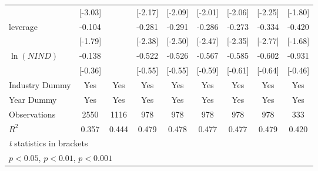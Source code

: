{\begin{tabular}{l*{8}{c}}
                    &     [-3.03]         &                     &     [-2.17]         &     [-2.09]         &     [-2.01]         &     [-2.06]         &     [-2.25]         &     [-1.80]         \\
[1em]
leverage            &      -0.104         &                     &      -0.281\sym{*}  &      -0.291\sym{*}  &      -0.286\sym{*}  &      -0.273\sym{*}  &      -0.334\sym{**} &      -0.420         \\
                    &     [-1.79]         &                     &     [-2.38]         &     [-2.50]         &     [-2.47]         &     [-2.35]         &     [-2.77]         &     [-1.68]         \\
[1em]
 $ \ln(NIND) $      &      -0.138         &                     &      -0.522         &      -0.526         &      -0.567         &      -0.585         &      -0.602         &      -0.931         \\
                    &     [-0.36]         &                     &     [-0.55]         &     [-0.55]         &     [-0.59]         &     [-0.61]         &     [-0.64]         &     [-0.46]         \\
\hline
Industry Dummy      &         Yes         &         Yes         &         Yes         &         Yes         &         Yes         &         Yes         &         Yes         &         Yes         \\
Year Dummy          &         Yes         &         Yes         &         Yes         &         Yes         &         Yes         &         Yes         &         Yes         &         Yes         \\
Observations        &        2550         &        1116         &         978         &         978         &         978         &         978         &         978         &         333         \\
$ R^2 $             &       0.357         &       0.444         &       0.479         &       0.478         &       0.477         &       0.477         &       0.479         &       0.420         \\
\hline\hline
\multicolumn{9}{l}{\footnotesize \textit{t} statistics in brackets}\\
\multicolumn{9}{l}{\footnotesize \sym{*} \(p<0.05\), \sym{**} \(p<0.01\), \sym{***} \(p<0.001\)}\\
\end{tabular}
}
